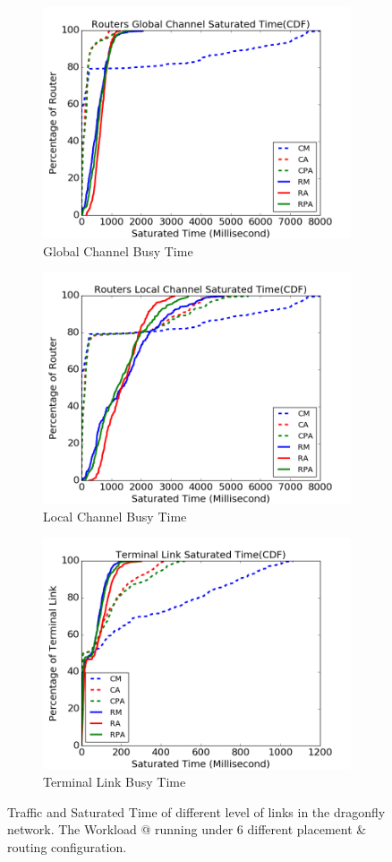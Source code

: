 \documentclass[conference,compsoc]{IEEEtran}
\makeatletter
\newcommand{\Rmnum}[1]{\expandafter\@slowromancap\romannumeral #1@}
\makeatother
\begin{document}
\begin{figure}[t]
    \begin{subfigure}[t]{0.32\textwidth}
        \centering
        \includegraphics[height=1.8 in]{syn-wkld/gc-btime}
        \caption{Global Channel Busy Time}
        \label{fig:synwkld-global-channel-stime}
    \end{subfigure}\hfill
     \hspace{1em}%
    \begin{subfigure}[t]{0.32\textwidth}
        \centering
        \includegraphics[height=1.8 in]{syn-wkld/lc-btime}
        \caption{Local Channel Busy Time}
        \label{fig:synwkld-local-channel-stime}
    \end{subfigure}\hfill
    \hspace{1em}%
    \begin{subfigure}[t]{0.32\textwidth}
        \centering
        \includegraphics[height=1.8 in]{syn-wkld/tl-btime}
        \caption{Terminal Link Busy Time}
        \label{fig:synwkld-terminal-link-stime}
    \end{subfigure}%
   \caption{Traffic and Saturated Time of different level of links in the dragonfly network. The Workload \Rmnum{2} running under 6 different placement \& routing configuration.}
   \label{fig:synwkld-network-traffic-stime}
\end{figure}
\end{document}

